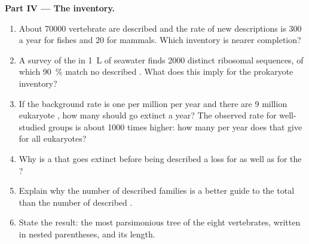 \begin{problem}
\medskip
\noindent\textbf{Part IV --- The inventory.}
\begin{enumerate}[resume]
  \item About \num{70000} vertebrate  are described and the
        rate of new descriptions is \num{300} a year for fishes and
        \num{20} for mammals. Which inventory is nearer completion?
  \item A survey of the  in \qty{1}{L} of seawater finds
        \num{2000} distinct ribosomal sequences, of which
        \qty{90}{\%} match no described . What does this
        imply for the prokaryote inventory?
  \item If the background  rate is one  per million
        per year and there are \num{9} million eukaryote ,
        how many should go extinct a year? The observed rate for
        well-studied groups is about \num{1000} times higher: how
        many per year does that give for all eukaryotes?
  \item Why is a  that goes extinct before being described a
        loss for  as well as for the ?
  \item Explain why the number of described families is a better
        guide to the total than the number of described .
  \item State the result: the most parsimonious tree of the eight
        vertebrates, written in nested parentheses, and its length.
\end{enumerate}
\end{problem}

